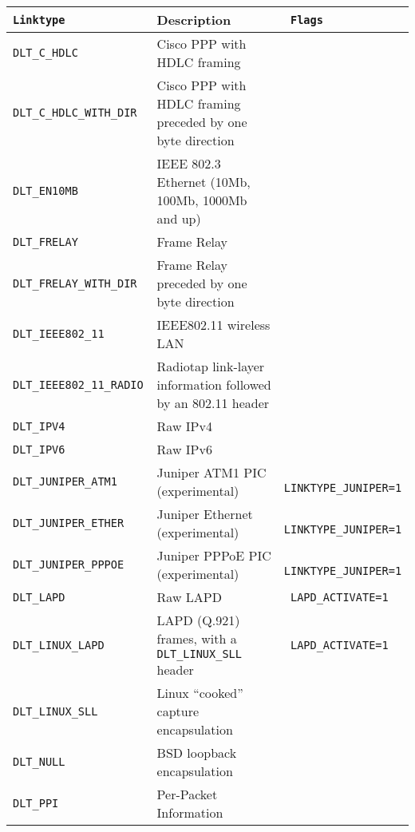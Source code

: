 \begin{longtable}{>{\tt\small}ll>{\tt\small}l}
    \toprule
    {\bf Linktype} & {\bf Description} & {\bf Flags}\\
    \midrule\endhead%
    DLT\_C\_HDLC            & Cisco PPP with HDLC framing                                   & \\
    DLT\_C\_HDLC\_WITH\_DIR & Cisco PPP with HDLC framing preceded by one byte direction    & \\
    DLT\_EN10MB             & IEEE 802.3 Ethernet (10Mb, 100Mb, 1000Mb and up)              & \\
    DLT\_FRELAY             & Frame Relay                                                   & \\
    DLT\_FRELAY\_WITH\_DIR  & Frame Relay preceded by one byte direction                    & \\
    DLT\_IEEE802\_11        & IEEE802.11 wireless LAN                                       & \\
    DLT\_IEEE802\_11\_RADIO & Radiotap link-layer information followed by an 802.11 header  & \\
    DLT\_IPV4               & Raw IPv4                                                      & \\
    DLT\_IPV6               & Raw IPv6                                                      & \\
    DLT\_JUNIPER\_ATM1      & Juniper ATM1 PIC (experimental)                               & LINKTYPE\_JUNIPER=1\\
    DLT\_JUNIPER\_ETHER     & Juniper Ethernet (experimental)                               & LINKTYPE\_JUNIPER=1\\
    DLT\_JUNIPER\_PPPOE     & Juniper PPPoE PIC (experimental)                              & LINKTYPE\_JUNIPER=1\\
    DLT\_LAPD               & Raw LAPD                                                      & LAPD\_ACTIVATE=1\\
    DLT\_LINUX\_LAPD        & LAPD (Q.921) frames, with a {\tt DLT\_LINUX\_SLL} header      & LAPD\_ACTIVATE=1\\
    DLT\_LINUX\_SLL         & Linux ``cooked'' capture encapsulation                        & \\
    DLT\_NULL               & BSD loopback encapsulation                                    & \\
    DLT\_PPI                & Per-Packet Information                                        & \\

\end{longtable}
